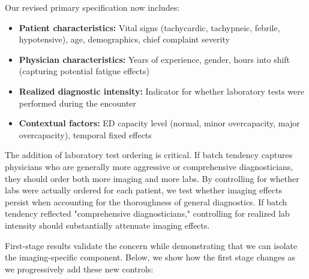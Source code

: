 \documentclass[11pt]{article}
\newcommand{\1}{\hbox{\rm 1\kern-.35em 1}}
\begin{document}
Our revised primary specification now includes:

\begin{itemize}
\item \textbf{Patient characteristics:} Vital signs (tachycardic, tachypneic, febrile, hypotensive), age, demographics, chief complaint severity
\item \textbf{Physician characteristics:} Years of experience, gender, hours into shift (capturing potential fatigue effects)
\item \textbf{Realized diagnostic intensity:} Indicator for whether laboratory tests were performed during the encounter
\item \textbf{Contextual factors:} ED capacity level (normal, minor overcapacity, major overcapacity), temporal fixed effects
\end{itemize}

The addition of laboratory test ordering is critical. If batch tendency captures physicians who are generally more aggressive or comprehensive diagnosticians, they should order both more imaging and more labs. By controlling for whether labs were actually ordered for each patient, we test whether imaging effects persist when accounting for the thoroughness of general diagnostics. If batch tendency reflected "comprehensive diagnosticians," controlling for realized lab intensity should substantially attenuate imaging effects.

First-stage results validate the concern while demonstrating that we can isolate the imaging-specific component. Below, we show how the first stage changes as we progressively add these new controls:
\end{document}
